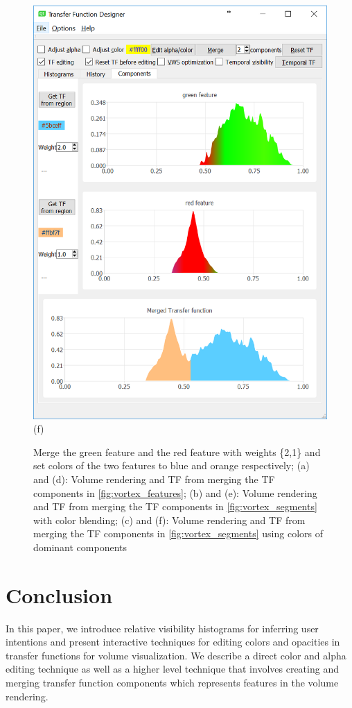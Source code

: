 \documentclass[twoside,twocolumn,10pt]{article}
\begin{document}
\begin{figure}
\begin{minipage}{.16\textwidth}
		\includegraphics[width=1\linewidth]{tf_vortex_merged_segment_green_red}
		(f)
	\end{minipage}
	\caption{Merge the green feature and the red feature with weights \{2,1\} and set colors of the two features to blue and orange respectively; (a) and (d): Volume rendering and TF from merging the TF components in \autoref{fig:vortex_features}; (b) and (e): Volume rendering and TF from merging the TF components in \autoref{fig:vortex_segments} with color blending; (c) and (f): Volume rendering and TF from merging the TF components in \autoref{fig:vortex_segments} using colors of dominant components}
	\label{fig:vortex_merged_2}
\end{figure}

\section{Conclusion}
In this paper, we introduce relative visibility histograms for inferring user intentions and present interactive techniques for editing colors and opacities in transfer functions for volume visualization. We describe a direct color and alpha editing technique as well as a higher level technique that involves creating and merging transfer function components which represents features in the volume rendering.
\end{document}
